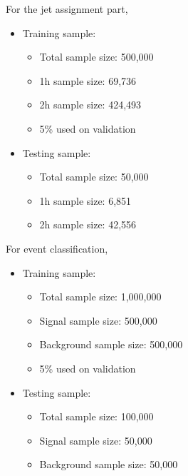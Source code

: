 \documentclass[12pt]{article}
\begin{document}
		For the jet assignment part,
		\begin{itemize}
			\item Training sample:
			\begin{itemize}
				\item Total sample size: 500,000
				\item 1h sample size: 69,736
				\item 2h sample size: 424,493
				\item 5\% used on validation
			\end{itemize}
			\item Testing sample:
			\begin{itemize}
				\item Total sample size: 50,000
				\item 1h sample size: 6,851
				\item 2h sample size: 42,556
			\end{itemize}
		\end{itemize}

		For event classification,
		\begin{itemize}
			\item Training sample:
			\begin{itemize}
				\item Total sample size: 1,000,000
				\item Signal sample size: 500,000
				\item Background sample size: 500,000
				\item 5\% used on validation
			\end{itemize}
			\item Testing sample:
			\begin{itemize}
				\item Total sample size: 100,000
				\item Signal sample size: 50,000
				\item Background sample size: 50,000
			\end{itemize}
		\end{itemize}
\end{document}
